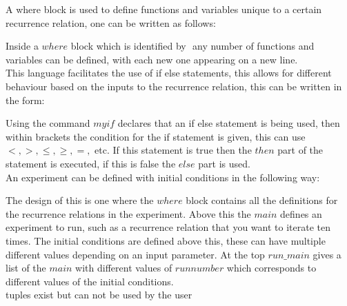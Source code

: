 \documentclass{article}
\begin{document}
A where block is used to define functions and variables unique to a certain recurrence relation, one can be written as follows:

Inside a $where$ block which is identified by ${}$ any number of functions and variables can be defined, with each new one appearing on a new line.\\
This language facilitates the use of if else statements, this allows for different behaviour based on the inputs to the recurrence relation, this can be written in the form:

Using the command $myif$ declares that an if else statement is being used, then within brackets the condition for the if statement is given, this can use $<, >, \leq, \geq, =,$ etc. If this statement is true then the $then$ part of the statement is executed, if this is false the $else$ part is used.\\
 An experiment can be defined with initial conditions in the following way:

The design of this is one where the $where$ block contains all the definitions for the recurrence relations in the experiment. Above this the $main$ defines an experiment to run, such as a recurrence relation that you want to iterate ten times. The initial conditions are defined above this, these can have multiple different values depending on an input parameter. At the top $run\_main$ gives a list of the $main$ with different values of $runnumber$ which corresponds to different values of the initial conditions.\\
 








tuples exist but can not be used by the user 
\end{document}
